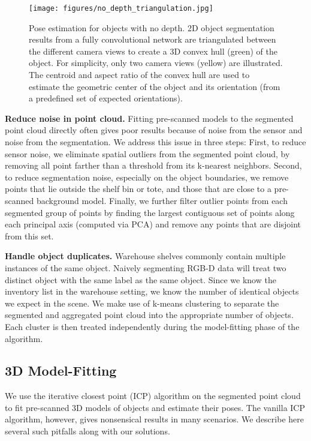 \documentclass[letterpaper, 10 pt, conference]{ieeeconf}  %
\newcommand{\myparagraph}[1]{\vspace{0.1in}\noindent\textbf{#1}}
\begin{document}
\begin{figure}[t]
\vspace{2mm}
\centering
  \texttt{[image: figures/no\_depth\_triangulation.jpg]}
  \caption{Pose estimation for objects with no depth. 2D object segmentation results from a fully convolutional network are triangulated between the different camera views to create a 3D convex hull (green) of the object. For simplicity, only two camera views (yellow) are illustrated. The centroid and aspect ratio of the convex hull are used to estimate the geometric center of the object and its orientation (from a predefined set of expected orientations).}
\vspace{-5mm}
\end{figure}


\myparagraph{Reduce noise in point cloud.} 
Fitting pre-scanned models to the segmented point cloud directly often gives poor results because of noise from the sensor and noise from the segmentation. We address this issue in three steps:
First, to reduce sensor noise, we eliminate spatial outliers from the segmented point cloud, by removing all point farther than a threshold from its k-nearest neighbors.
Second, to reduce segmentation noise, especially on the object boundaries, we remove points that lie outside the shelf bin or tote, and those that are close to a pre-scanned background model.
Finally, we further filter outlier points from each segmented group of points by finding the largest contiguous set of points along each principal axis (computed via PCA) and remove any points that are disjoint from this set.


\myparagraph{Handle object duplicates.} 
Warehouse shelves commonly contain multiple instances of the same object. Naively segmenting RGB-D data will treat two distinct object with the same label as the same object. Since we know the inventory list in the warehouse setting, we know the number of identical objects we expect in the scene. 
We make use of k-means clustering to separate the segmented and aggregated point cloud into the appropriate number of objects. Each cluster is then treated independently during the model-fitting phase of the algorithm.


\subsection{3D Model-Fitting}
We use the iterative closest point (ICP) algorithm  \cite{gelfand2003geometrically} on the segmented point cloud to fit pre-scanned 3D models of objects and estimate their poses. The vanilla ICP algorithm, however, gives nonsensical results in many scenarios. We describe here several such pitfalls along with our solutions.
\end{document}
